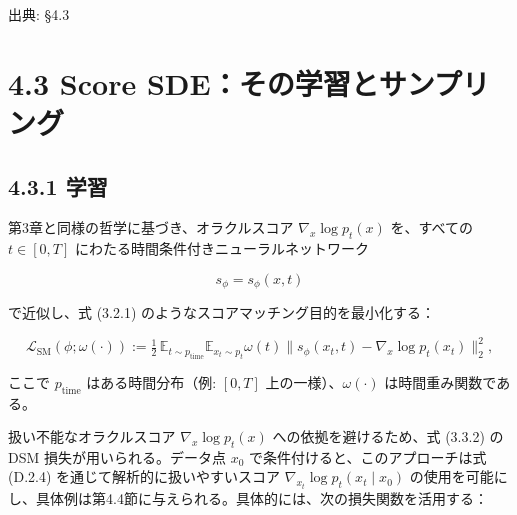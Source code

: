 

{\color{gray}\footnotesize 出典: §4.3\par}
\vspace{0.2em}

\section*{4.3 Score SDE：その学習とサンプリング}


\subsection*{4.3.1 学習}


第3章と同様の哲学に基づき、オラクルスコア $\nabla_x\log p_t(x)$ を、すべての $t\in[0,T]$ にわたる時間条件付きニューラルネットワーク

\[
s_\phi=s_\phi(x,t)
\]


で近似し、式 (3.2.1) のようなスコアマッチング目的を最小化する：

\[
\mathcal{L}_{\mathrm{SM}}(\phi;\omega(\cdot))
:= \tfrac12\,\mathbb{E}_{t\sim p_{\mathrm{time}}}\mathbb{E}_{x_t\sim p_t}
\omega(t)\bigl\|s_\phi(x_t,t)-\nabla_x\log p_t(x_t)\bigr\|_2^2,
\]


ここで $p_{\mathrm{time}}$ はある時間分布（例: $[0,T]$ 上の一様）、$\omega(\cdot)$ は時間重み関数である。



扱い不能なオラクルスコア $\nabla_x\log p_t(x)$ への依拠を避けるため、式 (3.3.2) の DSM 損失が用いられる。データ点 $x_0$ で条件付けると、このアプローチは式 (D.2.4) を通じて解析的に扱いやすいスコア $\nabla_{x_t}\log p_t(x_t\mid x_0)$ の使用を可能にし、具体例は第4.4節に与えられる。具体的には、次の損失関数を活用する：

